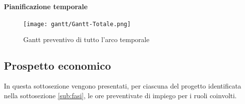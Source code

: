 \documentclass{scalatekids-article}
\begin{document}
\newpage
\paragraph{Pianificazione temporale}
\begin{figure}[H]
  \texttt{[image: gantt/Gantt-Totale.png]}
  \caption*{Gantt preventivo di tutto l'arco temporale}
\end{figure}

\newpage
\subsection{Prospetto economico}
In questa sottosezione vengono presentati, per ciascuna  del progetto identificata
nella sottosezione \ref{sub:fasi}, le ore preventivate di impiego per i ruoli coinvolti.
\end{document}
